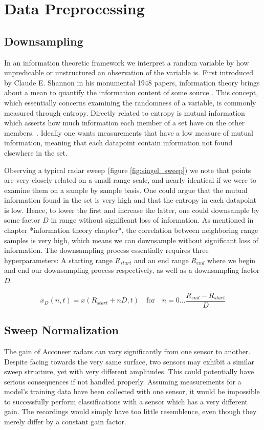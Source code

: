 \section{Data Preprocessing}
\subsection{Downsampling}

In an information theoretic framework we interpret a random variable by how unpredicable or unstructured an observation of the variable is\citep{anderson_johnnesson_2006}. First introduced by Claude E. Shannon in his monumental 1948 papers, information theory brings about a mean to quantify the information content of some source \citep{shannon_1948}. This concept, which essentially concerns examining the randomness of a variable, is commonly measured through entropy. Directly related to entropy is mutual information which asserts how much information each member of a set have on the other members. \citep{hyvasrinen_karhunen_oja_2004}. Ideally one wants measurements that have a low measure of mutual information, meaning that each datapoint contain information not found elsewhere in the set. 

Observing a typical radar sweep (figure \ref{fig:singel_sweep}) we note that points are very closely related on a small range scale, and nearly identical if we were to examine them on a sample by sample basis. One could argue that the mutual information found in the set is very high and that the entropy in each datapoint is low. Hence, to lower the first and increase the latter, one could downsample by some factor $D$ in range without significant loss of information.
As mentioned in chapter *information theory chapter*, the correlation between neighboring range samples is very high, which means we can downsample without significant loss of information. The downsampling process essentially requires three hyperparameters: A starting range $R_{start}$ and an end range $R_{end}$ where we begin and end our downsampling process respectively, as well as a downsampling factor $D$.

\begin{equation}
	x_D(n, t) = x(R_{start} + nD, t) \quad \text{for}\quad n=0...\frac{R_{end}-R_{start}}{D}
\end{equation}

\subsection{Sweep Normalization}
The gain of Acconeer radars can vary significantly from one sensor to another. Despite facing towards the very same surface, two sensors may exhibit a similar sweep structure,  yet with very different amplitudes. This could potentially have serious consequences if not handled properly. Assuming measurements for a model's training data have been collected with one sensor, it would be impossible to successfully perform classifications with a sensor which has a very different gain. The recordings would simply have too little resemblence, even though they merely differ by a constant gain factor.

